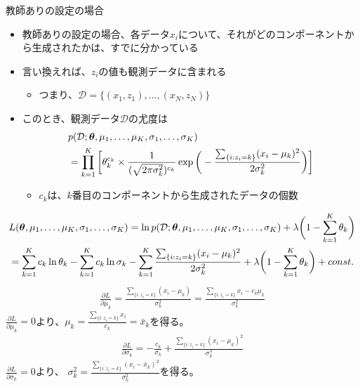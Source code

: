 \documentclass[aspectratio=169,unicode,dvipdfmx,14pt]{beamer}
\begin{document}
\begin{frame}{教師ありの設定の場合}
\begin{itemize}
\item 教師ありの設定の場合、各データ$x_i$について、それがどのコンポーネントから生成されたかは、すでに分かっている
\item 言い換えれば、$z_i$の値も観測データに含まれる
\begin{itemize}
\item つまり、$\mathcal{D} = \{ (x_1,z_1), \ldots, (x_N,z_N) \}$
\end{itemize}
\item このとき、観測データ$\mathcal{D}$の尤度は
\vspace{-.1in}
\begin{align}
& p(\mathcal{D};\bm{\theta},\mu_1,\ldots,\mu_K,\sigma_1,\ldots,\sigma_K)
\notag \\ &
= \prod_{k=1}^K \bigg[ \theta_k^{c_k} \times \frac{1}{ (\sqrt{2\pi\sigma_k^2} )^{c_k}} 
\exp\bigg( - \frac{ \sum_{ \{ i : z_i = k \} } (x_i - \mu_k)^2 }{2\sigma_k^2} \bigg) \bigg]
\end{align}
\vspace{-.1in}
\begin{itemize}
\item $c_k$は、$k$番目のコンポーネントから生成されたデータの個数
\end{itemize}
\end{itemize}
\end{frame}

\begin{frame}
\FontMath
\begin{align}
& L(\bm{\theta},\mu_1,\ldots,\mu_K,\sigma_1,\ldots,\sigma_K)
= \ln p(\mathcal{D};\bm{\theta},\mu_1,\ldots,\mu_K,\sigma_1,\ldots,\sigma_K) 
+ \lambda \bigg( 1 - \sum_{k=1}^K \theta_k \bigg)
\notag \\ &
= \sum_{k=1}^K c_k \ln \theta_k - \sum_{k=1}^K c_k \ln \sigma_k
- \sum_{k=1}^K \frac{\sum_{ \{ i : z_i = k \} } (x_i - \mu_k)^2}{ 2\sigma_k^2} + \lambda \bigg( 1 - \sum_{k=1}^K \theta_k \bigg) + const.
\end{align}
\begin{align}
\frac{\partial L}{\partial \mu_k} = \frac{ \sum_{ \{ i : z_i = k \} } (x_i - \mu_k) }{\sigma_k^2}
= \frac{ \sum_{ \{ i : z_i = k \} } x_i - c_k \mu_k }{\sigma_k^2}
\end{align}
$\frac{\partial L}{\partial \mu_k} = 0$より、$\mu_k = \frac{ \sum_{ \{ i : z_i = k \} } x_i }{ c_k } = \bar{x}_k$を得る。
\begin{align}
\frac{\partial L}{\partial \sigma_k} = - \frac{c_k}{\sigma_k} + \frac{\sum_{ \{ i : z_i = k \} } (x_i - \mu_k)^2}{ \sigma_k^3}
\end{align}
$\frac{\partial L}{\partial \sigma_k} = 0$より、
$\sigma_k^2 = \frac{\sum_{ \{ i : z_i = k \} } (x_i - \bar{x}_k)^2}{ \sigma_k^2}$を得る。
\end{frame}
\end{document}
